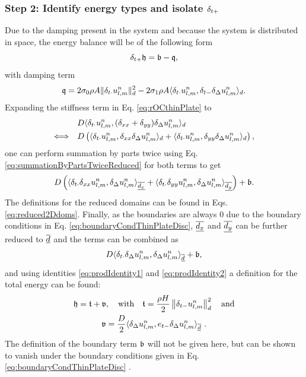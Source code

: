 {\subsubsection{Step 2: Identify energy types and isolate $\delta_{t+}$}
Due to the damping present in the system and because the system is distributed in space, the energy balance will be of the following form
\begin{equation*}
    \delta_{t+} \mathfrak{h} = \mathfrak{b}-\mathfrak{q}, 
\end{equation*}
with damping term
\begin{equation}\label{eq:dampingTermThinPlate}
    \mathfrak{q} = 2\sigma_{0} \rho A \lVert\delta_{t\cdot}u_{l,m}^n\rVert_d^2 - 2 \sigma_{1} \rho A \langle \delta_{t\cdot} u_{l,m}^n, \delta_{t-} \delta_{\Delta}u_{l,m}^n \rangle_d.
\end{equation}
Expanding the stiffness term in Eq. \eqref{eq:rOCthinPlate} to
\begin{align*}
    &\ D\langle \delta_{t\cdot} u_{l,m}^n, (\delta_{xx} + \delta_{yy})\delta_{\Delta} u_{l,m}^n \rangle_d\\
    \Longleftrightarrow\ \ &\ D\left(\langle \delta_{t\cdot} u_{l,m}^n, \delta_{xx}\delta_{\Delta} u_{l,m}^n \rangle_d + \langle \delta_{t\cdot} u_{l,m}^n, \delta_{yy}\delta_{\Delta} u_{l,m}^n \rangle_d\right),
\end{align*} 
one can perform summation by parts twice using Eq. \eqref{eq:summationByPartsTwiceReduced} for both terms to get
\begin{equation*}
    D\left(\langle \delta_{t\cdot} \delta_{xx}u_{l,m}^n, \delta_{\Delta} u_{l,m}^n \rangle_{\underline{\overline{d_x}}} + \langle \delta_{t\cdot}\delta_{yy} u_{l,m}^n, \delta_{\Delta} u_{l,m}^n \rangle_{\underline{\overline{d_y}}}\right) + \mathfrak{b}.
\end{equation*}
The definitions for the reduced domains can be found in Eqs. \eqref{eq:reduced2Ddoms}. Finally, as the boundaries are always $0$ due to the boundary conditions in Eq. \eqref{eq:boundaryCondThinPlateDisc}, $\underline{\overline{d_x}}$ and $\underline{\overline{d_y}}$ can be further reduced to $\underline{\overline{d}}$ and the terms can be combined as 
\begin{equation*}
    D\langle \delta_{t\cdot}\delta_{\Delta}u_{l,m}^n, \delta_{\Delta} u_{l,m}^n \rangle_{\underline{\overline{d}}} + \mathfrak{b} ,
\end{equation*}
and using identities \eqref{eq:prodIdentity1} and \eqref{eq:prodIdentity2} a definition for the total energy can be found:
\begin{equation}\label{eq:energyBalanceThinPlate}
    \begin{gathered}
        \mathfrak{h} = \mathfrak{t} + \mathfrak{v}, \quad \text{with} \quad \mathfrak{t} = \frac{\rho H}{2} \left\lVert\delta_{t-}u_{l,m}^n\right\rVert_{d}^2 \quad \text{and} \\
        \mathfrak{v} = \frac{D}{2}\langle\delta_{\Delta} u_{l,m}^n, e_{t-}\delta_{\Delta} u_{l,m}^n\rangle_{\overline{\underline{d}}}\ .
    \end{gathered}
\end{equation}
The definition of the boundary term $\mathfrak{b}$ will not be given here, but can be shown to vanish under the boundary conditions given in Eq. \eqref{eq:boundaryCondThinPlateDisc} \cite{theBible}.

}
